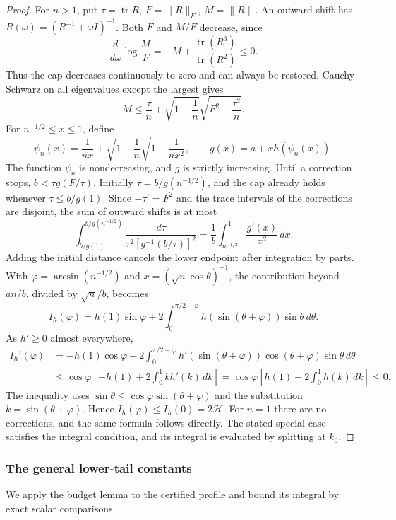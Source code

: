\documentclass[11pt,a4paper]{article}
\numberwithin{equation}{section}
\begin{document}
\begin{proof}
For $n>1$, put $\tau=\operatorname{tr}R$, $F=\|R\|_F$, $M=\|R\|$.
An outward shift has $R(\omega)=(R^{-1}+\omega I)^{-1}$.
Both $F$ and $M/F$ decrease, since
\[
 \frac{d}{d\omega}\log\frac MF
 =-M+\frac{\operatorname{tr}(R^3)}{\operatorname{tr}(R^2)}\le0.
\]
Thus the cap decreases continuously to zero and can always be restored.
Cauchy--Schwarz on all eigenvalues except the largest gives
\[
 M\le\frac\tau n+\sqrt{1-\frac1n}
                         \sqrt{F^2-\frac{\tau^2}{n}}.
\]
For $n^{-1/2}\le x\le1$, define
\[
 \psi_n(x)=\frac1{nx}+\sqrt{1-\frac1n}
                              \sqrt{1-\frac1{nx^2}},\qquad
 g(x)=a+xh(\psi_n(x)).
\]
The function $\psi_n$ is nondecreasing, and $g$ is strictly increasing.
Until a correction stops, $b<\tau g(F/\tau)$.
Initially $\tau=b/g(n^{-1/2})$, and the cap already holds whenever
$\tau\le b/g(1)$.
Since $-\tau'=F^2$ and the trace intervals of the corrections are disjoint,
the sum of outward shifts is at most
\[
 \int_{b/g(1)}^{b/g(n^{-1/2})}
 \frac{d\tau}{\tau^2[g^{-1}(b/\tau)]^2}
 =\frac1b\int_{n^{-1/2}}^1\frac{g'(x)}{x^2}\,dx.
\]
Adding the initial distance cancels the lower endpoint after integration
by parts. With $\varphi=\arcsin(n^{-1/2})$ and
$x=(\sqrt n\cos\theta)^{-1}$, the contribution beyond $an/b$,
divided by $\sqrt n/b$, becomes
\[
 I_h(\varphi)=h(1)\sin\varphi+
 2\int_0^{\pi/2-\varphi}
                  h(\sin(\theta+\varphi))\sin\theta\,d\theta.
\]
As $h'\ge0$ almost everywhere,
\[
 \begin{split}
 I_h'(\varphi)
 &=-h(1)\cos\varphi+
 2\int_0^{\pi/2-\varphi}
 h'(\sin(\theta+\varphi))\cos(\theta+\varphi)\sin\theta\,d\theta\\
 &\le\cos\varphi\left[-h(1)+2\int_0^1k h'(k)\,dk\right]
 =\cos\varphi\left[h(1)-2\int_0^1h(k)\,dk\right]\le0.
 \end{split}
\]
The inequality uses $\sin\theta\le\cos\varphi\sin(\theta+\varphi)$
and the substitution $k=\sin(\theta+\varphi)$.
Hence $I_h(\varphi)\le I_h(0)=2\mathcal H$.
For $n=1$ there are no corrections, and the same formula follows directly.
The stated special case satisfies the integral condition, and its
integral is evaluated by splitting at $k_0$.
\end{proof}


\subsubsection{The general lower-tail constants}
We apply the budget lemma to the certified profile and bound its integral
by exact scalar comparisons.
\end{document}
